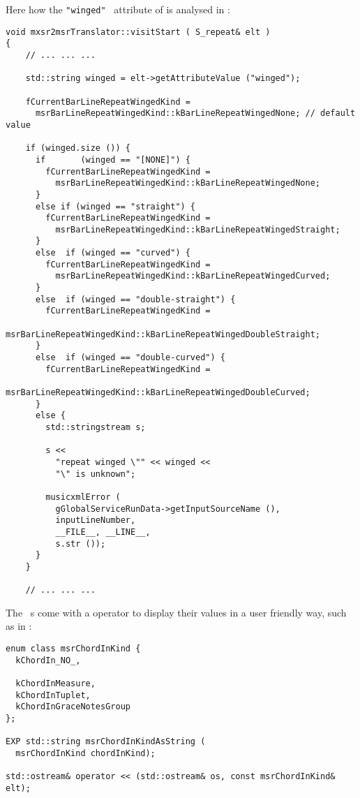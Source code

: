 Here how the {\tt "winged"} \mxml\ attribute of  is analysed in {\tt }:%
\begin{lstlisting}[language=CPlusPlus]
void mxsr2msrTranslator::visitStart ( S_repeat& elt )
{
    // ... ... ...

    std::string winged = elt->getAttributeValue ("winged");

    fCurrentBarLineRepeatWingedKind =
      msrBarLineRepeatWingedKind::kBarLineRepeatWingedNone; // default value

    if (winged.size ()) {
      if       (winged == "[NONE]") {
        fCurrentBarLineRepeatWingedKind =
          msrBarLineRepeatWingedKind::kBarLineRepeatWingedNone;
      }
      else if (winged == "straight") {
        fCurrentBarLineRepeatWingedKind =
          msrBarLineRepeatWingedKind::kBarLineRepeatWingedStraight;
      }
      else  if (winged == "curved") {
        fCurrentBarLineRepeatWingedKind =
          msrBarLineRepeatWingedKind::kBarLineRepeatWingedCurved;
      }
      else  if (winged == "double-straight") {
        fCurrentBarLineRepeatWingedKind =
          msrBarLineRepeatWingedKind::kBarLineRepeatWingedDoubleStraight;
      }
      else  if (winged == "double-curved") {
        fCurrentBarLineRepeatWingedKind =
          msrBarLineRepeatWingedKind::kBarLineRepeatWingedDoubleCurved;
      }
      else {
        std::stringstream s;

        s <<
          "repeat winged \"" << winged <<
          "\" is unknown";

        musicxmlError (
          gGlobalServiceRunData->getInputSourceName (),
          inputLineNumber,
          __FILE__, __LINE__,
          s.str ());
      }
    }

    // ... ... ...
\end{lstlisting}

The \mf\ \enumType s come with a \code{$<$$<$} operator to display their values in a user friendly way, such as  in :
\begin{lstlisting}[language=CPlusPlus]
enum class msrChordInKind {
  kChordIn_NO_,

  kChordInMeasure,
  kChordInTuplet,
  kChordInGraceNotesGroup
};

EXP std::string msrChordInKindAsString (
  msrChordInKind chordInKind);

std::ostream& operator << (std::ostream& os, const msrChordInKind& elt);
\end{lstlisting}

